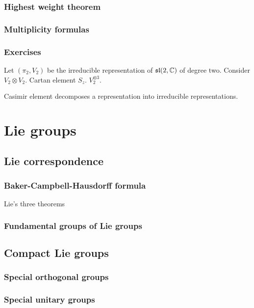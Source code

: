 \documentclass{../note}
\begin{document}
\section{Highest weight theorem}

\section{Multiplicity formulas}

\section*{Exercises}
\begin{prb}
Let $(\pi_2,V_2)$ be the irreducible representation of $\mathfrak{sl}(2,\mathbb{C})$ of degree two.
Consider $V_2\otimes V_2$.
Cartan element $S_z$.
$V_2^{\otimes3}$.
\end{prb}
\begin{prb}
Casimir element decomposes a representation into irreducible representations.
\end{prb}








\part{Lie groups}
\chapter{Lie correspondence}
\section{Baker-Campbell-Hausdorff formula}
Lie's three theorems
\section{Fundamental groups of Lie groups}

\chapter{Compact Lie groups}
\section{Special orthogonal groups}
\section{Special unitary groups}
\end{document}
